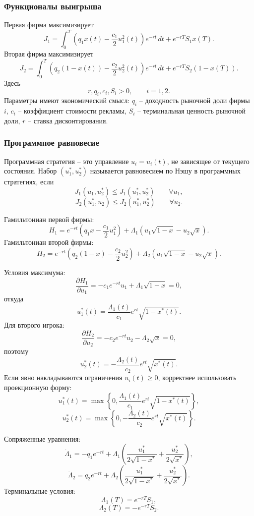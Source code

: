 \documentclass[12pt,a4paper]{article}
\begin{document}
\subsubsection{Функционалы выигрыша}

Первая фирма максимизирует
\[
 J_1=\int_0^T\left(q_1x(t)-\frac{c_1}{2}u_1^2(t)\right)e^{-rt}\,dt+e^{-rT}S_1x(T).
\]
Вторая фирма максимизирует
\[
 J_2=\int_0^T\left(q_2(1-x(t))-\frac{c_2}{2}u_2^2(t)\right)e^{-rt}\,dt+e^{-rT}S_2(1-x(T)).
\]
Здесь
\[
 r,q_i,c_i,S_i>0,
 \qquad i=1,2.
\]
Параметры имеют экономический смысл: $q_i$ -- доходность рыночной доли фирмы $i$, $c_i$ -- коэффициент стоимости рекламы, $S_i$ -- терминальная ценность рыночной доли, $r$ -- ставка дисконтирования.

\subsubsection{Программное равновесие}

Программная стратегия -- это управление $u_i=u_i(t)$, не зависящее от текущего состояния. Набор $(u_1^*,u_2^*)$ называется равновесием по Нэшу в программных стратегиях, если
\[
 J_1(u_1,u_2^*)\le J_1(u_1^*,u_2^*)\qquad \forall u_1,
\]
\[
 J_2(u_1^*,u_2)\le J_2(u_1^*,u_2^*)\qquad \forall u_2.
\]

Гамильтониан первой фирмы:
\[
 H_1=e^{-rt}\left(q_1x-\frac{c_1}{2}u_1^2\right)+\Lambda_1\left(u_1\sqrt{1-x}-u_2\sqrt{x}\right).
\]
Гамильтониан второй фирмы:
\[
 H_2=e^{-rt}\left(q_2(1-x)-\frac{c_2}{2}u_2^2\right)+\Lambda_2\left(u_1\sqrt{1-x}-u_2\sqrt{x}\right).
\]

Условия максимума:
\[
 \frac{\partial H_1}{\partial u_1}=-c_1e^{-rt}u_1+\Lambda_1\sqrt{1-x}=0,
\]
откуда
\[
 u_1^*(t)=\frac{\Lambda_1(t)}{c_1}e^{rt}\sqrt{1-x^*(t)}.
\]
Для второго игрока:
\[
 \frac{\partial H_2}{\partial u_2}=-c_2e^{-rt}u_2-\Lambda_2\sqrt{x}=0,
\]
поэтому
\[
 u_2^*(t)=-\frac{\Lambda_2(t)}{c_2}e^{rt}\sqrt{x^*(t)}.
\]
Если явно накладываются ограничения $u_i(t)\ge0$, корректнее использовать проекционную форму:
\[
 u_1^*(t)=\max\left\{0,\frac{\Lambda_1(t)}{c_1}e^{rt}\sqrt{1-x^*(t)}\right\},
\]
\[
 u_2^*(t)=\max\left\{0,-\frac{\Lambda_2(t)}{c_2}e^{rt}\sqrt{x^*(t)}\right\}.
\]

Сопряженные уравнения:
\[
 \dot\Lambda_1=-q_1e^{-rt}+\Lambda_1\left(\frac{u_1^*}{2\sqrt{1-x^*}}+\frac{u_2^*}{2\sqrt{x^*}}\right),
\]
\[
 \dot\Lambda_2=q_2e^{-rt}+\Lambda_2\left(\frac{u_1^*}{2\sqrt{1-x^*}}+\frac{u_2^*}{2\sqrt{x^*}}\right).
\]
Терминальные условия:
\[
 \Lambda_1(T)=e^{-rT}S_1,
\]
\[
 \Lambda_2(T)=-e^{-rT}S_2.
\]
\end{document}
